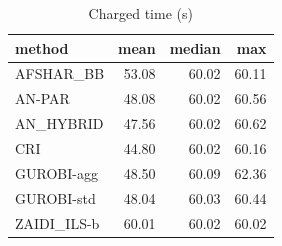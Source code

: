 \begin{table}[htbp]
\centering
\small
\caption{Charged time (s)}
\label{tab:E10b_state_of_the_art_60s_b60_time}
\begin{tabular}{lrrr}
\toprule
method & mean & median & max \\
\midrule
AFSHAR\_BB & 53.08 & 60.02 & 60.11 \\
AN-PAR & 48.08 & 60.02 & 60.56 \\
AN\_HYBRID & 47.56 & 60.02 & 60.62 \\
CRI & 44.80 & 60.02 & 60.16 \\
GUROBI-agg & 48.50 & 60.09 & 62.36 \\
GUROBI-std & 48.04 & 60.03 & 60.44 \\
ZAIDI\_ILS-b & 60.01 & 60.02 & 60.02 \\
\bottomrule
\end{tabular}
\end{table}
